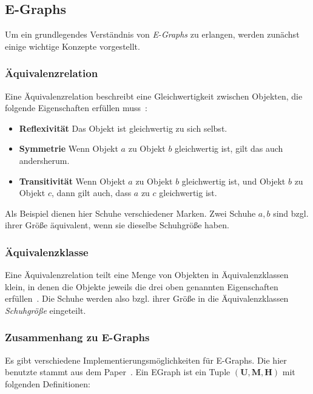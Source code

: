 \subsection{E-Graphs}

Um ein grundlegendes Verständnis von \textit{E-Graphs} zu erlangen, werden zunächst einige wichtige Konzepte vorgestellt.

\subsubsection{Äquivalenzrelation}

Eine Äquivalenzrelation beschreibt eine Gleichwertigkeit zwischen Objekten, die folgende Eigenschaften erfüllen muss~\cite{Ehrig2001}:

\begin{itemize}
  \item \textbf{Reflexivität} Das Objekt ist gleichwertig zu sich selbst.
  \item \textbf{Symmetrie} Wenn Objekt $a$ zu Objekt $b$ gleichwertig ist, gilt das auch andersherum.
  \item \textbf{Transitivität} Wenn Objekt $a$ zu Objekt $b$ gleichwertig ist, und Objekt $b$ zu Objekt $c$, dann gilt auch, dass $a$ zu $c$ gleichwertig ist.
\end{itemize}

Als Beispiel dienen hier Schuhe verschiedener Marken. Zwei Schuhe $a, b$ sind bzgl. ihrer Größe äquivalent, wenn sie dieselbe Schuhgröße haben. 

\subsubsection{Äquivalenzklasse}

Eine Äquivalenzrelation teilt eine Menge von Objekten in Äquivalenzklassen klein, in denen die Objekte jeweils die drei oben genannten Eigenschaften erfüllen~\cite{Ehrig2001}.
Die Schuhe werden also bzgl. ihrer Größe in die Äquivalenzklassen \textit{Schuhgröße} eingeteilt.

\subsubsection{Zusammenhang zu E-Graphs}


Es gibt verschiedene Implementierungsmöglichkeiten für E-Graphs. Die hier benutzte stammt aus dem Paper~\cite{2021-egg}.
Ein EGraph ist ein Tuple $(\mathbf{U}, \mathbf{M}, \mathbf{H})$ mit folgenden Definitionen:

